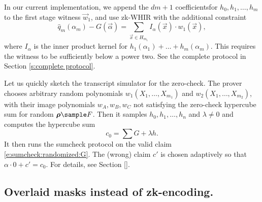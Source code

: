 \begin{rem}
In our current implementation, we append the $dm+1$ coefficients\footnotemark for $h_0,h_1,\ldots, h_m$ to the first stage witness $\vec w_1$, and use zk-WHIR with the additional constraint
\begin{equation}
\hat q_m(\alpha_m) - G(\vec\alpha) = \sum_{\vec x\in H_{m_1}} I_\alpha(\vec x)\cdot  w_1(\vec x),
\end{equation}
where $I_\alpha$ is the inner product kernel for $h_1(\alpha_1) + \ldots + h_m(\alpha_m)$.
This requires the witness to be sufficiently below a power two. 
See the complete protocol in Section \ref{s:complete protocol}.
\end{rem}

Let us quickly sketch the transcript simulator for the zero-check.
The prover chooses arbitrary random polynomials $w_1(X_1,\ldots, X_{m_1})$  and $w_2(X_1,\ldots, X_{m_2})$, with their image polynomials $w_A, w_B, w_C$ not satisfying the zero-check hypercube sum for random $\vec\rho\sample F$.
Then it samples $h_0,h_1,\ldots, h_n$ and $\lambda\neq 0$ and computes the hypercube sum
\begin{equation}
\label{e:sumcheck:randomized:G}
c_0 = \sum G + \lambda h.
\end{equation}
It then runs the sumcheck protocol on the valid claim \eqref{e:sumcheck:randomized:G}.
The (wrong) claim $c'$ is chosen adaptively so that $\alpha \cdot 0 + c' = c_0$. 
For details, see Section \ref{}.



\subsection{Overlaid masks instead of zk-encoding.}
\label{s:masked:commitments}

